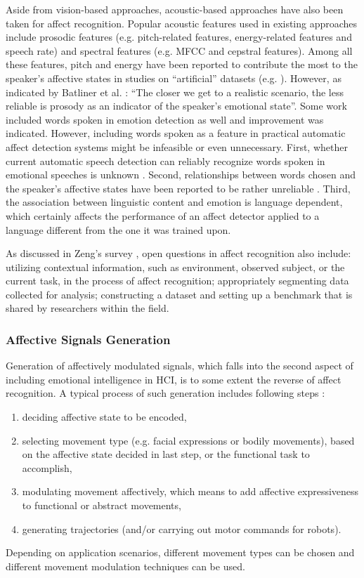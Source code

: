 Aside from vision-based approaches, acoustic-based approaches have also been taken for affect recognition. Popular acoustic features used in existing approaches include prosodic features (e.g. pitch-related features, energy-related features and speech rate) and spectral features (e.g. MFCC and cepstral features). Among all these features, pitch and energy have been reported to contribute the most to the speaker's affective states in studies on ``artificial'' datasets (e.g. \cite{kwon2003emotion}). However, as indicated by Batliner et al. \cite{batliner2003find}: ``The closer we get to a realistic scenario, the less reliable is prosody as an indicator of the speaker's emotional state''. Some work \cite{lee2005toward} included words spoken in emotion detection as well and improvement was indicated. However, including words spoken as a feature in practical automatic affect detection systems might be infeasible or even unnecessary. First, whether current automatic speech detection can reliably recognize words spoken in emotional speeches is unknown \cite{athanaselis2005asr}. Second, relationships between words chosen and the speaker's affective states have been reported to be rather unreliable \cite{ambady1992thin}. Third, the association between linguistic content and emotion is language dependent, which certainly affects the performance of an affect detector applied to a language different from the one it was trained upon.

As discussed in Zeng's survey \cite{zeng2009survey}, open questions in affect recognition also include: utilizing contextual information, such as environment, observed subject, or the current task, in the process of affect recognition; appropriately segmenting data collected for analysis; constructing a dataset and setting up a benchmark that is shared by researchers within the field.

\subsubsection{Affective Signals Generation}

Generation of affectively modulated signals, which falls into the second aspect of including emotional intelligence in HCI, is to some extent the reverse of affect recognition. A typical process of such generation includes following steps \cite{karg2013body}:
\begin{enumerate}
\item deciding affective state to be encoded,
\item selecting movement type (e.g. facial expressions or bodily movements), based on the affective state decided in last step, or the functional task to accomplish,
\item modulating movement affectively, which means to add affective expressiveness to functional or abstract movements,
\item generating trajectories (and/or carrying out motor commands for robots).
\end{enumerate}
Depending on application scenarios, different movement types can be chosen and different movement modulation techniques can be used. 


